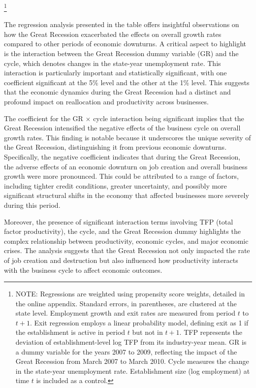 \documentclass[12pt]{article}
\begin{document}
\begin{table}[H]
    \footnote{NOTE: Regressions are weighted using propensity score weights, detailed in the online appendix. Standard errors, in parentheses, are clustered at the state level. Employment growth and exit rates are measured from period $t$ to $t+1$. Exit regression employs a linear probability model, defining exit as 1 if the establishment is active in period $t$ but not in $t+1$. TFP represents the deviation of establishment-level log TFP from its industry-year mean. GR is a dummy variable for the years 2007 to 2009, reflecting the impact of the Great Recession from March 2007 to March 2010. Cycle measures the change in the state-year unemployment rate. Establishment size (log employment) at time $t$ is included as a control.}  
\end{table}
The regression analysis presented in the table offers insightful observations on how the Great Recession exacerbated the
effects on overall growth rates compared to other periods of economic downturns. A critical aspect to highlight is the
interaction between the Great Recession dummy variable (GR) and the cycle, which denotes changes in the state-year
unemployment rate. This interaction is particularly important and statistically significant, with one coefficient
significant at the 5\% level and the other at the 1\% level. This suggests that the economic dynamics during the Great
Recession had a distinct and profound impact on reallocation and productivity across businesses. 

The coefficient for the GR $\times$ cycle interaction being significant implies that the Great Recession intensified the
negative effects of the business cycle on overall growth rates. This finding is notable because it underscores the
unique severity of the Great Recession, distinguishing it from previous economic downturns. Specifically, the negative
coefficient indicates that during the Great Recession, the adverse effects of an economic downturn on job creation and
overall business growth were more pronounced. This could be attributed to a range of factors, including tighter credit
conditions, greater uncertainty, and possibly more significant structural shifts in the economy that affected businesses
more severely during this period. 

Moreover, the presence of significant interaction terms involving TFP (total factor productivity), the cycle, and the
Great Recession dummy highlights the complex relationship between productivity, economic cycles, and major economic
crises. The analysis suggests that the Great Recession not only impacted the rate of job creation and destruction but
also influenced how productivity interacts with the business cycle to affect economic outcomes. 
\end{document}
